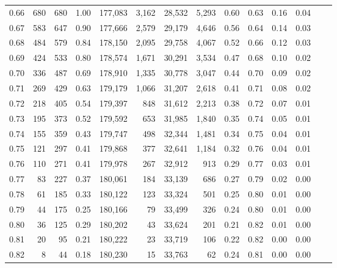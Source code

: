 \begin{tabular}{rrrrrrrrrrrrrr}
0.66 &    680 &    680 &    1.00 &  177,083 &    3,162 &  28,532 &   5,293 &  0.60 &  0.63 &  0.16 &      0.04 \\
0.67 &    583 &    647 &    0.90 &  177,666 &    2,579 &  29,179 &   4,646 &  0.56 &  0.64 &  0.14 &      0.03 \\
0.68 &    484 &    579 &    0.84 &  178,150 &    2,095 &  29,758 &   4,067 &  0.52 &  0.66 &  0.12 &      0.03 \\
0.69 &    424 &    533 &    0.80 &  178,574 &    1,671 &  30,291 &   3,534 &  0.47 &  0.68 &  0.10 &      0.02 \\
0.70 &    336 &    487 &    0.69 &  178,910 &    1,335 &  30,778 &   3,047 &  0.44 &  0.70 &  0.09 &      0.02 \\
0.71 &    269 &    429 &    0.63 &  179,179 &    1,066 &  31,207 &   2,618 &  0.41 &  0.71 &  0.08 &      0.02 \\
0.72 &    218 &    405 &    0.54 &  179,397 &      848 &  31,612 &   2,213 &  0.38 &  0.72 &  0.07 &      0.01 \\
0.73 &    195 &    373 &    0.52 &  179,592 &      653 &  31,985 &   1,840 &  0.35 &  0.74 &  0.05 &      0.01 \\
0.74 &    155 &    359 &    0.43 &  179,747 &      498 &  32,344 &   1,481 &  0.34 &  0.75 &  0.04 &      0.01 \\
0.75 &    121 &    297 &    0.41 &  179,868 &      377 &  32,641 &   1,184 &  0.32 &  0.76 &  0.04 &      0.01 \\
0.76 &    110 &    271 &    0.41 &  179,978 &      267 &  32,912 &     913 &  0.29 &  0.77 &  0.03 &      0.01 \\
0.77 &     83 &    227 &    0.37 &  180,061 &      184 &  33,139 &     686 &  0.27 &  0.79 &  0.02 &      0.00 \\
0.78 &     61 &    185 &    0.33 &  180,122 &      123 &  33,324 &     501 &  0.25 &  0.80 &  0.01 &      0.00 \\
0.79 &     44 &    175 &    0.25 &  180,166 &       79 &  33,499 &     326 &  0.24 &  0.80 &  0.01 &      0.00 \\
0.80 &     36 &    125 &    0.29 &  180,202 &       43 &  33,624 &     201 &  0.21 &  0.82 &  0.01 &      0.00 \\
0.81 &     20 &     95 &    0.21 &  180,222 &       23 &  33,719 &     106 &  0.22 &  0.82 &  0.00 &      0.00 \\
0.82 &      8 &     44 &    0.18 &  180,230 &       15 &  33,763 &      62 &  0.24 &  0.81 &  0.00 &      0.00 \\

\end{tabular}

